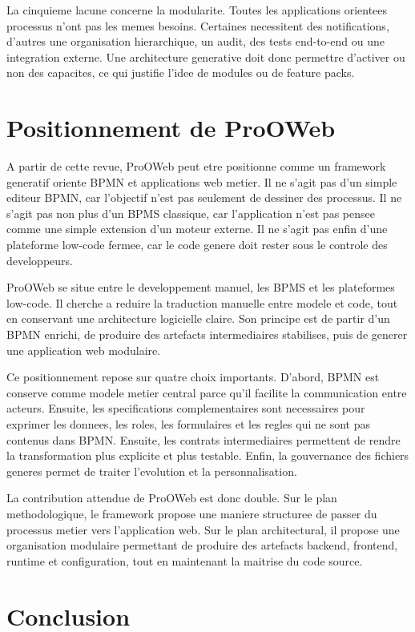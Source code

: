 \documentclass[12pt,a4paper]{article}
\begin{document}
La cinquieme lacune concerne la modularite. Toutes les applications orientees processus n'ont pas les memes besoins. Certaines necessitent des notifications, d'autres une organisation hierarchique, un audit, des tests end-to-end ou une integration externe. Une architecture generative doit donc permettre d'activer ou non des capacites, ce qui justifie l'idee de modules ou de feature packs.

\section{Positionnement de ProOWeb}

A partir de cette revue, ProOWeb peut etre positionne comme un framework generatif oriente BPMN et applications web metier. Il ne s'agit pas d'un simple editeur BPMN, car l'objectif n'est pas seulement de dessiner des processus. Il ne s'agit pas non plus d'un BPMS classique, car l'application n'est pas pensee comme une simple extension d'un moteur externe. Il ne s'agit pas enfin d'une plateforme low-code fermee, car le code genere doit rester sous le controle des developpeurs.

ProOWeb se situe entre le developpement manuel, les BPMS et les plateformes low-code. Il cherche a reduire la traduction manuelle entre modele et code, tout en conservant une architecture logicielle claire. Son principe est de partir d'un BPMN enrichi, de produire des artefacts intermediaires stabilises, puis de generer une application web modulaire.

Ce positionnement repose sur quatre choix importants. D'abord, BPMN est conserve comme modele metier central parce qu'il facilite la communication entre acteurs. Ensuite, les specifications complementaires sont necessaires pour exprimer les donnees, les roles, les formulaires et les regles qui ne sont pas contenus dans BPMN. Ensuite, les contrats intermediaires permettent de rendre la transformation plus explicite et plus testable. Enfin, la gouvernance des fichiers generes permet de traiter l'evolution et la personnalisation.

La contribution attendue de ProOWeb est donc double. Sur le plan methodologique, le framework propose une maniere structuree de passer du processus metier vers l'application web. Sur le plan architectural, il propose une organisation modulaire permettant de produire des artefacts backend, frontend, runtime et configuration, tout en maintenant la maitrise du code source.

\section{Conclusion}
\end{document}
